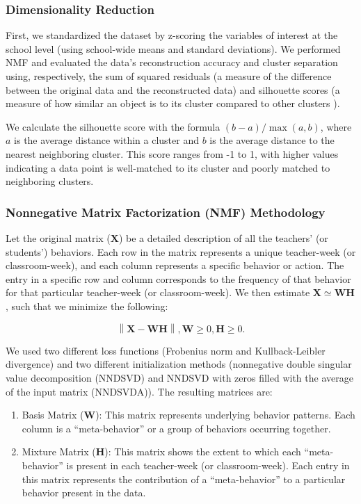 \documentclass[
  number,
  preprint,
  3p,
  onecolumn]{elsarticle}
\providecommand{\tightlist}{%
  \setlength{\itemsep}{0pt}\setlength{\parskip}{0pt}}\usepackage{longtable,booktabs,array}
\begin{document}
\subsubsection{Dimensionality
Reduction}\label{dimensionality-reduction-1}

First, we standardized the dataset by z-scoring the variables of
interest at the school level (using school-wide means and standard
deviations). We performed NMF and evaluated the data's reconstruction
accuracy and cluster separation using, respectively, the sum of squared
residuals (a measure of the difference between the original data and the
reconstructed data) and silhouette scores (a measure of how similar an
object is to its cluster compared to other clusters
\citep{rousseeuw1987}).

We calculate the silhouette score with the formula
\((b - a) / \max(a, b)\), where \(a\) is the average distance within a
cluster and \(b\) is the average distance to the nearest neighboring
cluster. This score ranges from -1 to 1, with higher values indicating a
data point is well-matched to its cluster and poorly matched to
neighboring clusters.

\subsubsection{Nonnegative Matrix Factorization (NMF)
Methodology}\label{nonnegative-matrix-factorization-nmf-methodology}

Let the original matrix (\(\mathbf{X}\)) be a detailed description of
all the teachers' (or students') behaviors. Each row in the matrix
represents a unique teacher-week (or classroom-week), and each column
represents a specific behavior or action. The entry in a specific row
and column corresponds to the frequency of that behavior for that
particular teacher-week (or classroom-week). We then estimate
\(\mathbf{X} \simeq \mathbf{W}\mathbf{H}\), such that we minimize the
following:

\[
\left\| \mathbf{X} - \mathbf{W}\mathbf{H} \right\| , \mathbf{W} \geq 0, \mathbf{H} \geq 0.
\]

We used two different loss functions (Frobenius norm and
Kullback-Leibler divergence) and two different initialization methods
(nonnegative double singular value decomposition (NNDSVD) and NNDSVD
with zeros filled with the average of the input matrix (NNDSVDA)). The
resulting matrices are:

\begin{enumerate}
\def\labelenumi{\arabic{enumi}.}
\tightlist
\item
  Basis Matrix (\(\mathbf{W}\)): This matrix represents underlying
  behavior patterns. Each column is a ``meta-behavior'' or a group of
  behaviors occurring together.
\item
  Mixture Matrix (\(\mathbf{H}\)): This matrix shows the extent to which
  each ``meta-behavior'' is present in each teacher-week (or
  classroom-week). Each entry in this matrix represents the contribution
  of a ``meta-behavior'' to a particular behavior present in the data.
\end{enumerate}
\end{document}
